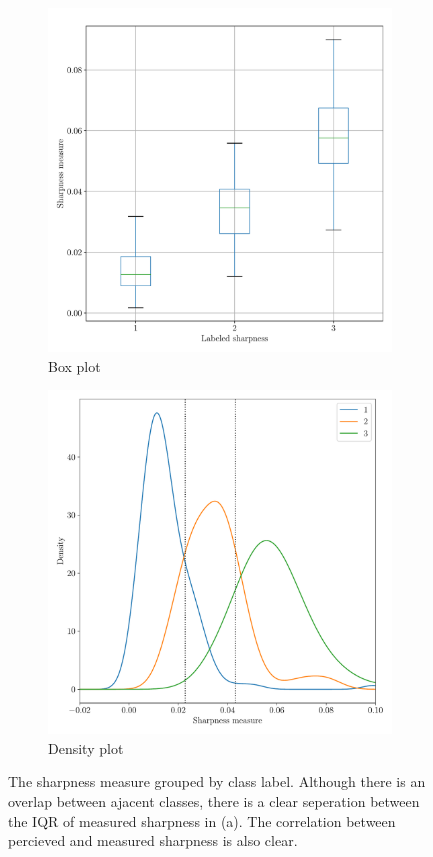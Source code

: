 \begin{figure}[htbp]
  \centering
  \begin{subfigure}[t]{0.49\textwidth}
    \centering
    \includegraphics[width=\textwidth]{figs/box.pdf}
    \caption{Box plot}\label{fig:sharpness-box}
\end{subfigure}%
\hfill
\begin{subfigure}[t]{0.48\textwidth}
  \centering
  \includegraphics[width=\textwidth]{figs/qden.pdf}
  \caption{Density plot}\label{fig:sharpness-qden}
\end{subfigure}
  \caption[Sharpness measure seperability]{The sharpness measure grouped by class label. Although there is an overlap between ajacent classes, there is a clear seperation between the IQR of measured sharpness in (a). The correlation between percieved and measured sharpness is also clear.}\label{fig:sharpness}
\end{figure}
